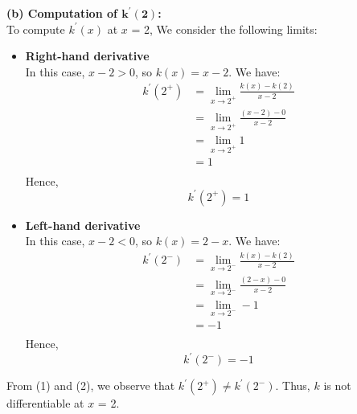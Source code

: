 \textbf{(b) Computation of \(\mathbf{k^{\prime}(2)}\):}\\
    To compute $k^{\prime}(x)$ at $x$ = 2, We consider the following limits: 
    \begin{itemize}
        \item \textbf{Right-hand derivative} \\
        In this case, $x-2 > 0$, so $k(x) = x - 2$.
        We have:
        \begin{equation*}
        \begin{split}
            k^{\prime}(2^+) &= \lim_{x\to 2^+} \frac{k(x) - k(2)}{x-2} \\
            &= \lim_{x\to 2^+} \frac{(x-2) - 0}{x-2} \\
            &= \lim_{x\to 2^+} 1 \\
            &= 1 \\
        \end{split}
        \end{equation*}
        Hence, \begin{equation}
        k^{\prime}(2^+) = 1 
        \end{equation}
        \item \textbf{Left-hand derivative} \\
        In this case, $x-2 < 0$, so $k(x) = 2 - x$.
        We have:
        \begin{equation*}
        \begin{split}
            k^{\prime}(2^-) &= \lim_{x\to 2^-} \frac{k(x) - k(2)}{x-2} \\
            &= \lim_{x\to 2^-} \frac{(2-x) - 0}{x-2} \\
            &= \lim_{x\to 2^-} -1 \\
            &= -1 \\
        \end{split}
        \end{equation*}
        Hence, \begin{equation}
        k^{\prime}(2^-) = -1
        \end{equation}
    \end{itemize}
    From (1) and (2), we observe that $k^{\prime}(2^+) \neq k^{\prime}(2^-)$. Thus, $k$ is not differentiable at $x$ = 2.

